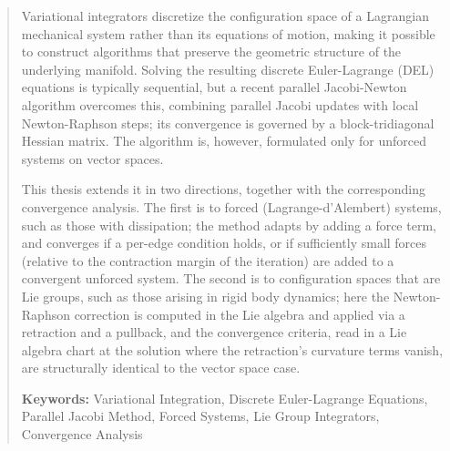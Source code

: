 \renewcommand\abstractname{\large\bfseries\filcenter\uppercase{Summary}}
\begin{abstract}
\thispagestyle{plain}
\setcounter{page}{3}
	Variational integrators discretize the configuration space of a Lagrangian mechanical system rather than its equations of motion, making it possible to construct algorithms that preserve the geometric structure of the underlying manifold. Solving the resulting discrete Euler-Lagrange (DEL) equations is typically sequential, but a recent parallel Jacobi-Newton algorithm overcomes this, combining parallel Jacobi updates with local Newton-Raphson steps; its convergence is governed by a block-tridiagonal Hessian matrix. The algorithm is, however, formulated only for unforced systems on vector spaces.

	This thesis extends it in two directions, together with the corresponding convergence analysis. The first is to forced (Lagrange-d'Alembert) systems, such as those with dissipation; the method adapts by adding a force term, and converges if a per-edge condition holds, or if sufficiently small forces (relative to the contraction margin of the iteration) are added to a convergent unforced system. The second is to configuration spaces that are Lie groups, such as those arising in rigid body dynamics; here the Newton-Raphson correction is computed in the Lie algebra and applied via a retraction and a pullback, and the convergence criteria, read in a Lie algebra chart at the solution where the retraction's curvature terms vanish, are structurally identical to the vector space case.

	\bigskip
	\noindent\textbf{Keywords:}
	Variational Integration, 
    Discrete Euler-Lagrange Equations, 
    Parallel Jacobi Method, 
    Forced Systems, 
    Lie Group Integrators,
    Convergence Analysis
	\vfill
\end{abstract}
	\newpage %
	\thispagestyle{empty}
	\mbox{}

